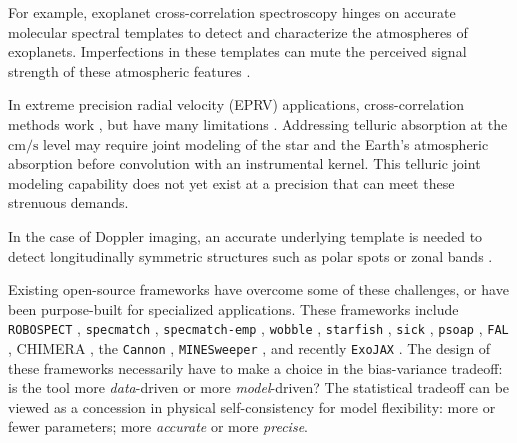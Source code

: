 \documentclass[modern]{aastex631}
\begin{document}
For example, exoplanet cross-correlation spectroscopy \citep{2013MNRAS.436L..35B} hinges on accurate molecular spectral templates to detect and characterize the atmospheres of exoplanets.  Imperfections in these templates can mute the perceived signal strength of these atmospheric features \citep{2015A&A...575A..20H}.

In extreme precision radial velocity (EPRV) applications, cross-correlation methods work \citep{2018A_A...620A..47D}, but have many limitations \citep{2022arXiv220110639Z}.  Addressing telluric absorption at the $\mathrm{cm/s}$ level may require joint modeling of the star and the Earth's atmospheric absorption before convolution with an instrumental kernel.  This telluric joint modeling capability does not yet exist at a precision that can meet these strenuous demands.

In the case of Doppler imaging, an accurate underlying template is needed to detect longitudinally symmetric structures \citep{1983PASP...95..565V,2021arXiv211006271L} such as polar spots \citep{roettenbacher16} or zonal bands \citep{Crossfield14,2021ApJ...906...64A}.

Existing open-source frameworks have overcome some of these challenges, or have been purpose-built for specialized applications.
These frameworks include \texttt{ROBOSPECT} \citep{2013PASP..125.1164W}, \texttt{specmatch} \citep{2015PhDT........82P}, \texttt{specmatch-emp} \citep{2017ApJ...836...77Y}, \texttt{wobble} \citep{2019AJ....158..164B}, \texttt{starfish} \citep{czekala15}, \texttt{sick} \citep{2016ApJS..223....8C}, \texttt{psoap} \citep{2017ApJ...840...49C}, \texttt{FAL} , CHIMERA \citep{2015ApJ...807..183L}, the \texttt{Cannon} \citep{2017ApJ...836....5H},  \texttt{MINESweeper} \citep{2020ApJ...900...28C}, and recently \texttt{ExoJAX} \citep{2022ApJS..258...31K}.
The design of these frameworks necessarily have to make a choice in the bias-variance tradeoff: is the tool more \emph{data}-driven or more \emph{model}-driven?  The statistical tradeoff can be viewed as a concession in physical self-consistency for model flexibility: more or fewer parameters; more \emph{accurate} or more \emph{precise}.
\end{document}
